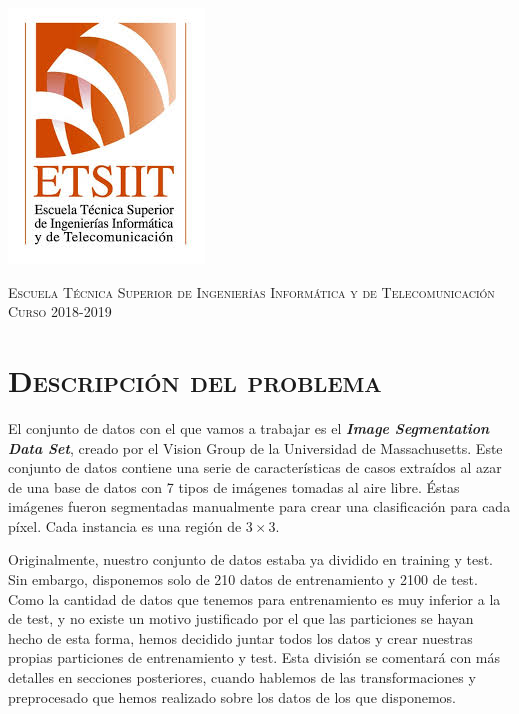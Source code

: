 \documentclass[11pt,a4paper]{article}
\begin{document}
\begin{titlepage}
\begin{minipage}{\textwidth}
\includegraphics[scale=0.3]{img/etsiit.jpeg}

\vspace{0.7cm}
\textsc{Escuela Técnica Superior de Ingenierías Informática y de Telecomunicación}\\
\vspace{1cm}
\textsc{Curso 2018-2019}
\end{minipage}
\end{titlepage}

\tableofcontents
\thispagestyle{empty}				%


\newpage

\setlength{\parskip}{1em}

\section{\textsc{Descripción del problema}}

El conjunto de datos con el que vamos a trabajar es el \textbf{\textit{Image Segmentation Data Set}}, creado por el Vision Group de
la Universidad de Massachusetts. Este conjunto de datos contiene una serie de características de casos extraídos al azar
de una base de datos con 7 tipos de imágenes tomadas al aire libre. Éstas imágenes fueron segmentadas manualmente para
crear una clasificación para cada píxel. Cada instancia es una región de $3 \times 3$.

Originalmente, nuestro conjunto de datos estaba ya dividido en training y test. Sin embargo, disponemos solo de 210 datos
de entrenamiento y 2100 de test. Como la cantidad de datos que tenemos para entrenamiento es muy inferior a la de test, y
no existe un motivo justificado por el que las particiones se hayan hecho de esta forma, hemos decidido juntar todos los
datos y crear nuestras propias particiones de entrenamiento y test. Esta división se comentará con más detalles en
secciones posteriores, cuando hablemos de las transformaciones y preprocesado que hemos realizado sobre los datos de los
que disponemos. 
\end{document}
